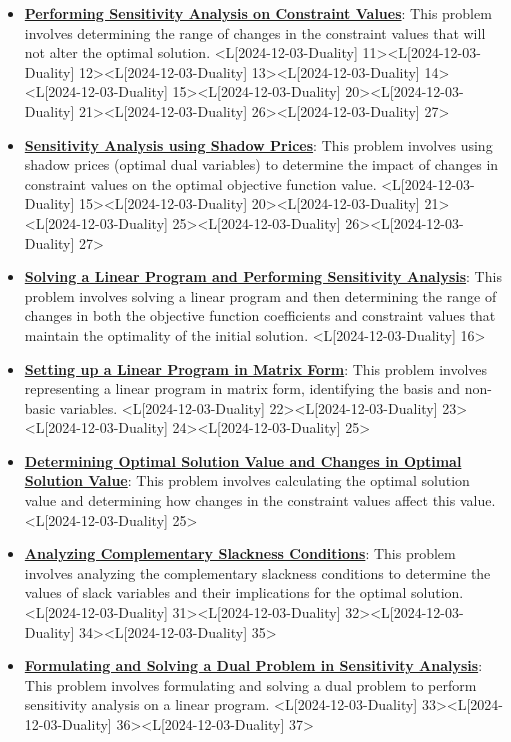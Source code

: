 \documentclass{article}%
\begin{document}
\begin{itemize}[[leftmargin=*]]
\item \href{https://www.math.purdue.edu/~yipn/421/2024-12-03-Duality.pdf#page=11}{\textbf{Performing Sensitivity Analysis on Constraint Values}}: This problem involves determining the range of changes in the constraint values that will not alter the optimal solution. <L[2024-12-03-Duality] 11><L[2024-12-03-Duality] 12><L[2024-12-03-Duality] 13><L[2024-12-03-Duality] 14><L[2024-12-03-Duality] 15><L[2024-12-03-Duality] 20><L[2024-12-03-Duality] 21><L[2024-12-03-Duality] 26><L[2024-12-03-Duality] 27>%
\item \href{https://www.math.purdue.edu/~yipn/421/2024-12-03-Duality.pdf#page=15}{\textbf{Sensitivity Analysis using Shadow Prices}}: This problem involves using shadow prices (optimal dual variables) to determine the impact of changes in constraint values on the optimal objective function value. <L[2024-12-03-Duality] 15><L[2024-12-03-Duality] 20><L[2024-12-03-Duality] 21><L[2024-12-03-Duality] 25><L[2024-12-03-Duality] 26><L[2024-12-03-Duality] 27>%
\item \href{https://www.math.purdue.edu/~yipn/421/2024-12-03-Duality.pdf#page=16}{\textbf{Solving a Linear Program and Performing Sensitivity Analysis}}: This problem involves solving a linear program and then determining the range of changes in both the objective function coefficients and constraint values that maintain the optimality of the initial solution. <L[2024-12-03-Duality] 16>%
\item \href{https://www.math.purdue.edu/~yipn/421/2024-12-03-Duality.pdf#page=22}{\textbf{Setting up a Linear Program in Matrix Form}}: This problem involves representing a linear program in matrix form, identifying the basis and non-basic variables. <L[2024-12-03-Duality] 22><L[2024-12-03-Duality] 23><L[2024-12-03-Duality] 24><L[2024-12-03-Duality] 25>%
\item \href{https://www.math.purdue.edu/~yipn/421/2024-12-03-Duality.pdf#page=25}{\textbf{Determining Optimal Solution Value and Changes in Optimal Solution Value}}: This problem involves calculating the optimal solution value and determining how changes in the constraint values affect this value. <L[2024-12-03-Duality] 25>%
\item \href{https://www.math.purdue.edu/~yipn/421/2024-12-03-Duality.pdf#page=31}{\textbf{Analyzing Complementary Slackness Conditions}}: This problem involves analyzing the complementary slackness conditions to determine the values of slack variables and their implications for the optimal solution. <L[2024-12-03-Duality] 31><L[2024-12-03-Duality] 32><L[2024-12-03-Duality] 34><L[2024-12-03-Duality] 35>%
\item \href{https://www.math.purdue.edu/~yipn/421/2024-12-03-Duality.pdf#page=33}{\textbf{Formulating and Solving a Dual Problem in Sensitivity Analysis}}: This problem involves formulating and solving a dual problem to perform sensitivity analysis on a linear program. <L[2024-12-03-Duality] 33><L[2024-12-03-Duality] 36><L[2024-12-03-Duality] 37>%
\end{itemize}%
\newpage
\end{document}
